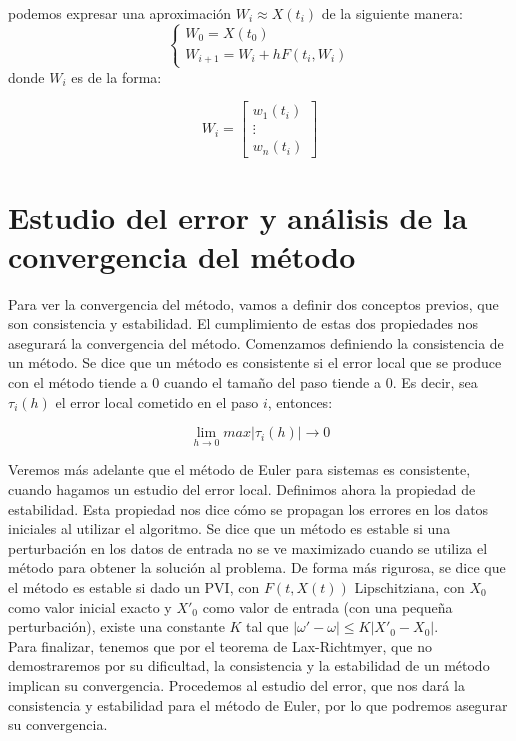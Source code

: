 \documentclass[12pt]{article}       %
\begin{document}
podemos expresar una aproximación $W_i \approx X(t_i)$ de la siguiente manera:
$$
\begin{cases}
W_0=X(t_0)\\
W_{i+1}=W_i + hF(t_i,W_i)
\end{cases}
$$
donde $W_i$ es de la forma:

\begin{equation*}
W_i=\begin{bmatrix}
w_1(t_i) \\
\vdots \\
w_n(t_i)
\end{bmatrix}
\end{equation*}

\section{Estudio del error y análisis de la convergencia del método}

Para ver la convergencia del método, vamos a definir dos conceptos previos, que son consistencia y estabilidad. El cumplimiento de estas dos propiedades nos asegurará la convergencia del método. Comenzamos definiendo la consistencia de un método. Se dice que un método es consistente si el error local que se produce con el método tiende a 0 cuando el tamaño del paso tiende a 0. Es decir, sea $\tau_i(h)$ el error local cometido en el paso $i$, entonces:

$$ \lim_{h \rightarrow 0} max | \tau_i(h) | \rightarrow 0 $$

Veremos más adelante que el método de Euler para sistemas es consistente, cuando hagamos un estudio del error local. Definimos ahora la propiedad de estabilidad. Esta propiedad nos dice cómo se propagan los errores en los datos iniciales al utilizar el algoritmo. Se dice que un método es estable si una perturbación en los datos de entrada no se ve maximizado cuando se utiliza el método para obtener la solución al problema. De forma más rigurosa, se dice que el método es estable si dado un PVI, con $F(t, X(t))$ Lipschitziana, con $X_0$ como valor inicial exacto y $X'_0$ como valor de entrada (con una pequeña perturbación), existe una constante $K$ tal que $|\omega' - \omega| \leq K|X'_0 - X_0|$.\\

Para finalizar, tenemos que por el teorema de Lax-Richtmyer, que no demostraremos por su dificultad, la consistencia y la estabilidad de un método implican su convergencia. Procedemos al estudio del error, que nos dará la consistencia y estabilidad para el método de Euler, por lo que podremos asegurar su convergencia.\\
\end{document}
